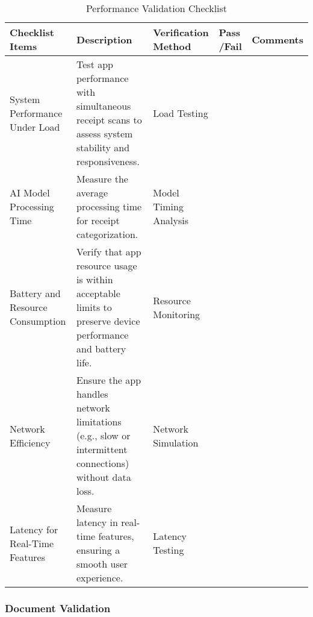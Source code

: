 \documentclass[12pt, titlepage]{article}
\begin{document}
\begin{table}[h!]
\caption{Performance Validation Checklist}
\noindent \begin{tabular}{|>{\raggedright\arraybackslash}p{3cm}|>{\raggedright\arraybackslash}p{4cm}|>{\raggedright\arraybackslash}p{3cm}|p{1cm}|p{2.25cm}|}
	\hline
	\textbf{Checklist Items} & \textbf{Description} & \textbf{Verification Method} & \textbf{Pass /Fail} & \textbf{Comments} \\ 
	\hline
	System Performance Under Load & Test app performance with simultaneous receipt scans to assess system stability and responsiveness.	& Load Testing & & \\
	\hline
	AI Model Processing Time & Measure the average processing time for receipt categorization. & Model Timing Analysis & & \\
	\hline
	Battery and Resource Consumption & Verify that app resource usage is within acceptable limits to preserve device performance and battery life. & Resource Monitoring & & \\
	\hline
	Network Efficiency & Ensure the app handles network limitations (e.g., slow or intermittent connections) without data loss.	& Network Simulation & & \\
	\hline
	Latency for Real-Time Features & Measure latency in real-time features, ensuring a smooth user experience. & Latency Testing & & \\
	\hline
\end{tabular}
\end{table}

\newpage

\subsubsection{Document Validation}
\end{document}
